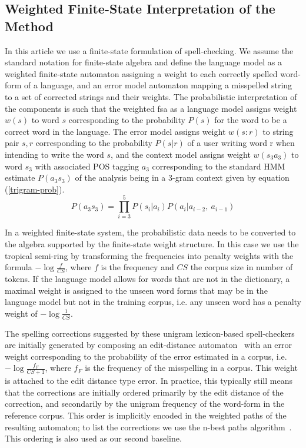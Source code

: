\documentclass{llncs}
\begin{document}
\subsection{Weighted Finite-State Interpretation of the Method}

In this article we use a finite-state formulation of
spell-checking. We assume the standard notation for finite-state
algebra and define the language model as a weighted finite-state
automaton assigning a weight to each correctly spelled word-form of a
language, and an error model automaton mapping a misspelled string to
a set of corrected strings and their weights. The probabilistic
interpretation of the components is such that the weighted fsa as a
language model assigns weight $w(s)$ to word $s$ corresponding to the
probability $P(s)$ for the word to be a correct word in the
language. The error model assigns weight $w(s:r)$ to string pair $s,
r$ corresponding to the probability $P(s|r)$ of a user writing word r
when intending to write the word $s$, and the context model assigns
weight $w(s_3 a_3)$ to word $s_3$ with associated POS tagging $a_3$
corresponding to the standard HMM estimate $P(a_3 s_3)$ of the analysis being in
a 3-gram context given by equation (\ref{trigram-prob}).
\begin{equation}\label{trigram-prob}
P(a_3 s_3) = \prod_{i=3}^{5}P(s_i|a_i)P(a_i|a_{i-2},\ a_{i-1})
\end{equation}


In a weighted finite-state system, the probabilistic data needs to be converted
to the algebra supported by the finite-state weight structure.  In this case we
use the tropical semi-ring by transforming the frequencies into penalty weights
with the formula $-\log\frac{f}{CS}$, where $f$ is the frequency and $CS$ the
corpus size in number of tokens. If the language model allows for words that
are not in the dictionary, a maximal weight is assigned to the unseen word
forms that may be in the language model but not in the training corpus, i.e.
any unseen word has a penalty weight of $-\log\frac{1}{CS}$.

The spelling corrections suggested by these unigram lexicon-based
spell-checkers are initially generated by composing an edit-distance
automaton~\cite{agata/2002} with an error weight corresponding to the
probability of the error estimated in a corpus, i.e. $-\log\frac{f_{F}}{CS+1}$,
where $f_F$ is the frequency of the misspelling in a corpus. This weight is
attached to the edit distance type error. In practice, this typically still
means that the corrections are initially ordered primarily by the edit distance
of the correction, and secondarily by the unigram frequency of the word-form in
the reference corpus.  This order is implicitly encoded in the weighted paths
of the resulting automaton; to list the corrections we use the n-best paths
algorithm~\cite{mohri/2002}. This ordering is also used as our second baseline.
\end{document}
